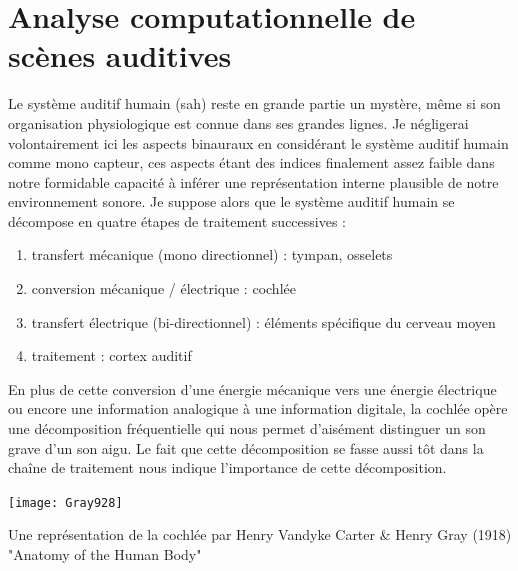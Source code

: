 
  \section{\nmu Analyse computationnelle de scènes auditives} \label{sec:asa}

  Le système auditif humain (sah) reste en grande partie un mystère, même si son organisation physiologique est connue dans ses grandes lignes. Je négligerai volontairement ici les aspects binauraux en considérant le système auditif humain comme mono capteur, ces aspects étant des indices finalement assez faible dans notre formidable capacité à inférer une représentation interne plausible de notre environnement sonore. Je suppose alors que le système auditif humain se décompose en quatre étapes de traitement successives :
  \begin{enumerate}
    \item transfert mécanique (mono directionnel) : tympan, osselets
    \item conversion mécanique / électrique : cochlée
    \item transfert électrique (bi-directionnel) : éléments spécifique du cerveau moyen
    \item traitement : cortex auditif
  \end{enumerate}

  En plus de cette conversion d'une énergie mécanique vers une énergie électrique ou encore une information analogique à une information digitale, la cochlée opère une décomposition fréquentielle qui nous permet d'aisément distinguer un son grave d'un son aigu. Le fait que cette décomposition se fasse aussi tôt dans la chaîne de traitement nous indique l'importance de cette décomposition.

  \begin{marginfigure}
    \texttt{[image: Gray928]}
    \caption{Une représentation de la cochlée par Henry Vandyke Carter \& Henry Gray (1918) "Anatomy of the Human Body"} %
  \end{marginfigure}

